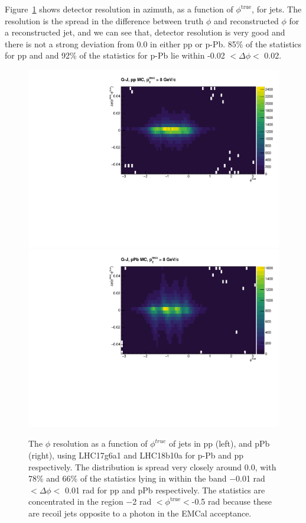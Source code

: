 Figure~\ref{fig:jetphidphiRes} shows detector resolution in azimuth, as a function of $\phi^{\mathrm{true}}$, for jets. The resolution is the spread in the difference between truth $\phi$ and reconstructed $\phi$ for a reconstructed jet, and we can see that, detector resolution is very good and there is not a strong deviation from 0.0 in either pp or p-Pb. 85\% of the statistics for pp and and 92\% of the statistics for p-Pb lie within -0.02 $< \Delta\phi <$ 0.02. 
\begin{figure}[h]
\center
\includegraphics[width=.495\textwidth]{JetResponse/dphivphi_pp.pdf}
\includegraphics[width=.495\textwidth]{JetResponse/dphivphi_pPb.pdf}
\caption{The $\phi$ resolution as a function of $\phi^{true}$ of jets in pp (left), and pPb (right), using LHC17g6a1 and LHC18b10a for p-Pb and pp respectively. The distribution is spread very closely around 0.0, with 78\% and 66\% of the statistics lying in within the band $-$0.01 rad $< \Delta\phi <$ 0.01 rad for pp and pPb respectively. The statistics are concentrated in the region $-$2 rad $< \phi^{\mathrm{true}} <$-0.5 rad because these are recoil jets opposite to a photon in the EMCal acceptance.}
\label{fig:jetphidphiRes}
\end{figure}


